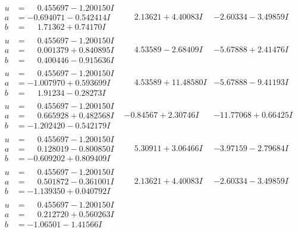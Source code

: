 \documentclass[1p]{elsarticle_modified}
\theoremstyle{definition}
\begin{document}
$$\begin{array}{c|c|c}
\begin{aligned}
u &= \phantom{-}0.455697 - 1.200150 I \\
a &= -0.694071 - 0.542414 I \\
b &= \phantom{-}1.71362 + 0.74170 I\end{aligned}
 & \phantom{-}2.13621 + 4.40083 I & -2.60334 - 3.49859 I \\ \hline\begin{aligned}
u &= \phantom{-}0.455697 - 1.200150 I \\
a &= \phantom{-}0.001379 + 0.840895 I \\
b &= \phantom{-}0.400446 - 0.915636 I\end{aligned}
 & \phantom{-}4.53589 - 2.68409 I & -5.67888 + 2.41476 I \\ \hline\begin{aligned}
u &= \phantom{-}0.455697 - 1.200150 I \\
a &= -1.007970 + 0.593699 I \\
b &= \phantom{-}1.91234 - 0.28273 I\end{aligned}
 & \phantom{-}4.53589 + 11.48580 I & -5.67888 - 9.41193 I \\ \hline\begin{aligned}
u &= \phantom{-}0.455697 - 1.200150 I \\
a &= \phantom{-}0.665928 + 0.482568 I \\
b &= -1.202420 - 0.542179 I\end{aligned}
 & -0.84567 + 2.30746 I & -11.77068 + 0.66425 I \\ \hline\begin{aligned}
u &= \phantom{-}0.455697 - 1.200150 I \\
a &= \phantom{-}0.128019 - 0.800850 I \\
b &= -0.609202 + 0.809409 I\end{aligned}
 & \phantom{-}5.30911 + 3.06466 I & -3.97159 - 2.79684 I \\ \hline\begin{aligned}
u &= \phantom{-}0.455697 - 1.200150 I \\
a &= \phantom{-}0.501872 - 0.361001 I \\
b &= -1.139350 + 0.040792 I\end{aligned}
 & \phantom{-}2.13621 + 4.40083 I & -2.60334 - 3.49859 I \\ \hline\begin{aligned}
u &= \phantom{-}0.455697 - 1.200150 I \\
a &= \phantom{-}0.212720 + 0.560263 I \\
b &= -1.06501 - 1.41566 I\end{aligned}

\end{array}$$
\end{document}

